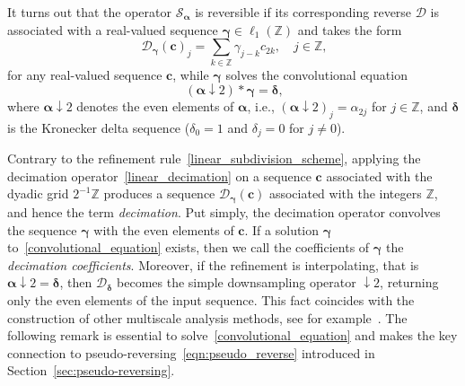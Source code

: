 \documentclass[12pt]{article}
\begin{document}
It turns out that the operator $\mathcal{S}_{\boldsymbol{\alpha}}$ is reversible if its corresponding reverse $\mathcal{D}$ is associated with a real-valued sequence $\boldsymbol{\gamma}\in\ell_1(\mathbb{Z})$ and takes the form
\begin{equation}~\label{linear_decimation}
\mathcal{D}_{\boldsymbol{\gamma}}(\boldsymbol{c})_j = \sum_{k\in\mathbb{Z}}\gamma_{j-k}c_{2k}, \quad j\in\mathbb{Z},
\end{equation}
for any real-valued sequence $\boldsymbol{c}$, while $\boldsymbol{\gamma}$ solves the convolutional equation
\begin{equation}~\label{convolutional_equation}
(\boldsymbol{\alpha}\downarrow 2) * \boldsymbol{\gamma} = \boldsymbol{\delta},
\end{equation}
where $\boldsymbol{\alpha}\downarrow 2$ denotes the even elements of $\boldsymbol{\alpha}$, i.e., $(\boldsymbol{\alpha}\downarrow 2)_j = \alpha_{2j}$ for $j\in\mathbb{Z}$, and $\boldsymbol{\delta}$ is the Kronecker delta sequence ($\delta_0=1$ and $\delta_j=0$ for $j\neq0$).

Contrary to the refinement rule~\eqref{linear_subdivision_scheme}, applying the decimation operator~\eqref{linear_decimation} on a sequence $\boldsymbol{c}$ associated with the dyadic grid $2^{-1}\mathbb{Z}$ produces a sequence $\mathcal{D}_{\boldsymbol{\gamma}}(\boldsymbol{c})$ associated with the integers $\mathbb{Z}$, and hence the term \emph{decimation}. Put simply, the decimation operator convolves the sequence $\boldsymbol{\gamma}$ with the even elements of $\boldsymbol{c}$. If a solution $\boldsymbol{\gamma}$ to~\eqref{convolutional_equation} exists, then we call the coefficients of $\boldsymbol{\gamma}$ the \emph{decimation coefficients}. Moreover, if the refinement is interpolating, that is $\boldsymbol{\alpha}\downarrow 2=\boldsymbol{\delta}$, then $\mathcal{D}_{\boldsymbol{\delta}}$ becomes the simple downsampling operator $\downarrow 2$, returning only the even elements of the input sequence. This fact coincides with the construction of other multiscale analysis methods, see for example~\cite{conti2010full, grohs2009interpolatory, rahman2005multiscale}. The following remark is essential to solve~\eqref{convolutional_equation} and makes the key connection to pseudo-reversing~\eqref{eqn:pseudo_reverse} introduced in Section~\ref{sec:pseudo-reversing}.
\end{document}
